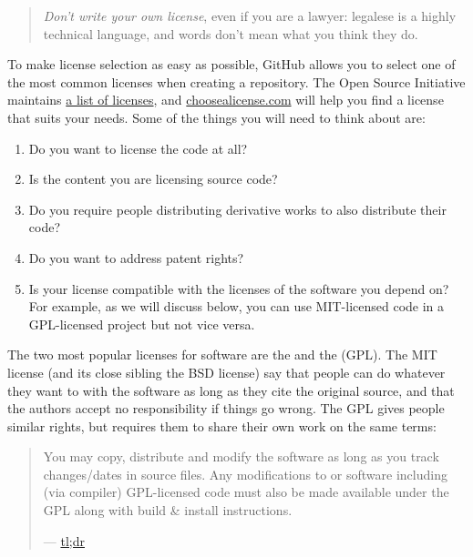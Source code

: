 \begin{quote}\setlength{\parindent}{0pt}
\emph{Don't write your own license},
even if you are a lawyer:
legalese is a highly technical language,
and words don't mean what you think they do.
\end{quote}

To make license selection as easy as possible,
GitHub allows you to select one of the most common licenses when creating a repository.
The Open Source Initiative maintains \href{http://opensource.org/licenses}{a list of licenses},
and \href{http://choosealicense.com/}{choosealicense.com} will help you find a license that suits your needs.
Some of the things you will need to think about are:

\begin{enumerate}
\item
  Do you want to license the code at all?
\item
  Is the content you are licensing source code?
\item
  Do you require people distributing derivative works to also distribute their code?
\item
  Do you want to address patent rights?
\item
  Is your license compatible with the licenses of the software you depend on?
  For example, as we will discuss below,
  you can use MIT-licensed code in a GPL-licensed project but not vice versa.
\end{enumerate}

The two most popular licenses for software are
the  and the  (GPL).
The MIT license (and its close sibling the BSD license)
say that people can do whatever they want to with the software as long as they cite the original source,
and that the authors accept no responsibility if things go wrong.
The GPL gives people similar rights,
but requires them to share their own work on the same terms:

\begin{quote}\setlength{\parindent}{0pt}
You may copy, distribute and modify the software as long as you track changes/dates in source files.
Any modifications to or software including (via compiler) GPL-licensed code must also be made available under the GPL
along with build \& install instructions.

--- \href{https://tldrlegal.com/license/gnu-general-public-license-v3-(gpl-3)}{tl;dr}
\end{quote}

